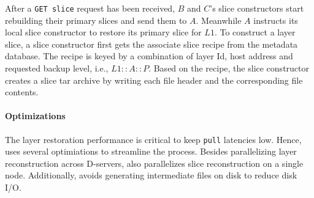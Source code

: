 After a \texttt{GET slice} request has been received, 
$B$ and $C$'s slice constructors start rebuilding their primary slices and send them to $A$.
Meanwhile $A$ instructs its local slice constructor to restore its primary slice for $L1$.
%
To construct a layer slice, a slice constructor first gets the associate slice recipe
from the metadata database. The recipe is keyed by a combination of layer Id, host address and requested
backup level, i.e., $L1::A::P$.
%
Based on the recipe, the slice constructor creates a slice tar archive by writing each file header and the corresponding
file contents.
\paragraph{Optimizations}
The layer restoration performance is critical to keep \texttt{pull} latencies low. Hence,
\sysname uses several optimiations to streamline the process.
%
Besides parallelizing layer reconstruction across D-servers, \sysname also
parallelizes slice reconstruction on a single node.
%
Additionally, \sysname avoids generating intermediate files on disk to reduce disk I/O.
%
%

